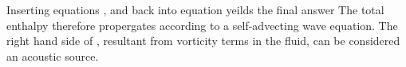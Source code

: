 Inserting equations \eqnref{}, \eqnref{} and \eqnref{} back into equation \eqnref{} yeilds the final answer 
The total enthalpy therefore propergates according to a self-advecting wave equation.
The right hand side of , resultant from vorticity terms in the fluid, can be considered an acoustic source.




%



